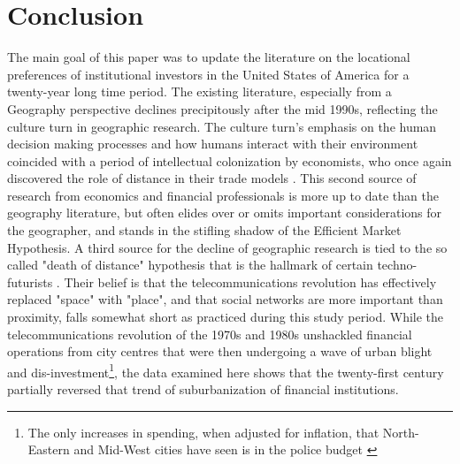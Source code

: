 \chapter {Conclusion}

The main goal of this paper was to update the literature on the locational preferences of institutional investors in the United States of America for a twenty-year long time period.  The existing literature, especially from a Geography perspective declines precipitously after the mid 1990s, reflecting the culture turn in geographic research.  The culture turn's emphasis on the human decision making processes and how humans interact with their environment coincided with a period of intellectual colonization by economists, who once again discovered the role of distance in their trade models \citep{scotta2004}.  This second source of research from economics and financial professionals is more up to date than the geography literature, but often elides over or omits important considerations for the geographer, and stands in the stifling shadow of the Efficient Market Hypothesis.  A third source for the decline of geographic research is tied to the so called "death of distance" hypothesis that is the hallmark of certain techno-futurists \citep{Obrian1992}.  Their belief is that the telecommunications revolution has effectively replaced "space" with "place", and that social networks are more important than proximity, falls somewhat short as practiced during this study period.  While the telecommunications revolution of the 1970s and 1980s unshackled financial operations from city centres that were then undergoing a wave of urban blight and dis-investment\footnote{The only increases in spending, when adjusted for inflation, that North-Eastern and Mid-West cities have seen is in the police budget \citep{derenoncourt2019can}}, the data examined here shows that the twenty-first century partially reversed that trend of suburbanization of financial institutions. 

